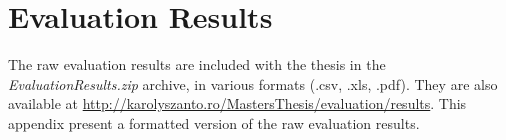 \chapter{Evaluation Results}\label{ch:evaluation_results}
The raw evaluation results are included with the thesis in the \emph{EvaluationResults.zip} archive, in various formats (.csv, .xls, .pdf). They are also available at \url{http://karolyszanto.ro/MastersThesis/evaluation/results}. This appendix present a formatted version of the raw evaluation results.



